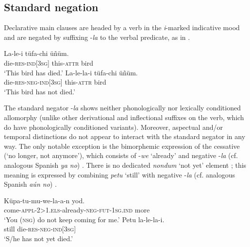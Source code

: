 \documentclass[output=paper,colorlinks,citecolor=brown,draft]{langscibook}
\begin{document}
\subsection{Standard negation}
\label{sec:mapu:2.1}
Declarative main clauses are headed by a verb in the \textit{i}{}-marked indicative mood and are negated by suffixing -\textit{la} to the verbal predicate, as in .

\ea\label{ex:mapu:1}
    \ea\label{ex:mapu:1a}
        \gll La-le-i tüfa-chi üñüm.\\
             die-\textsc{res-ind[3sg]} this-\textsc{attr} bird \\
        \glt ‘This bird has died.’
    \ex\label{ex:mapu:1b}
        \gll La-le-la-i tüfa-chi üñüm. \\
             die-\textsc{res-neg-ind[3sg]} this-\textsc{attr} bird \\
        \glt ‘This bird has not died.’
    \z
\z 

The standard negator \nobreakdash-\textit{la} shows neither phonologically nor lexically conditioned allomorphy (unlike other derivational and inflectional suffixes on the verb, which do have phonologically conditioned variants). Moreover, aspectual and/or temporal distinctions do not appear to interact with the standard negator in any way. The only notable exception is the bimorphemic expression of the cessative (‘no longer, not anymore’), which consists of -\textit{we} ‘already’ and negative -\textit{la} (cf. analogous Spanish \textit{ya no}) . There is no dedicated \textit{nondum} ‘not yet’ element \citep{Veselinova2017}; this meaning is expressed by combining \textit{petu} ‘still’ with negative \nobreakdash-\textit{la} (cf. analogous Spanish \textit{aún no}) .

\ea\label{ex:mapu:2}
    \ea\label{ex:mapu:2a}
        \gll Küpa-tu-mu-we-la-a-n yod. \\
             come-\textsc{appl-2>1.els-}already-\textsc{neg-fut-1sg.ind} more\\
        \glt ‘You (\textsc{nsg}) do not keep coming for me.’\footnotemark
         \citep[215]{Salas2006}
    \ex\label{ex:mapu:2b}
        \gll Petu la-le-la-i. \\
             still die-\textsc{res}{}-\textsc{neg-ind[3sg]} \\
        \glt ‘S/he has not yet died.’
    \z
\z 
\end{document}

